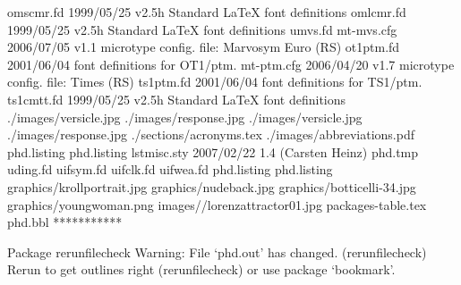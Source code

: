   omscmr.fd    1999/05/25 v2.5h Standard LaTeX font definitions
  omlcmr.fd    1999/05/25 v2.5h Standard LaTeX font definitions
    umvs.fd
  mt-mvs.cfg    2006/07/05 v1.1 microtype config. file: Marvosym Euro (RS)
  ot1ptm.fd    2001/06/04 font definitions for OT1/ptm.
  mt-ptm.cfg    2006/04/20 v1.7 microtype config. file: Times (RS)
  ts1ptm.fd    2001/06/04 font definitions for TS1/ptm.
 ts1cmtt.fd    1999/05/25 v2.5h Standard LaTeX font definitions
./images/versicle.jpg
./images/response.jpg
./images/versicle.jpg
./images/response.jpg
./sections/acronyms.tex
./images/abbreviations.pdf
     phd.listing
     phd.listing
 lstmisc.sty    2007/02/22 1.4 (Carsten Heinz)
     phd.tmp
   uding.fd
  uifsym.fd
  uifclk.fd
  uifwea.fd
     phd.listing
     phd.listing
graphics/krollportrait.jpg
graphics/nudeback.jpg
graphics/botticelli-34.jpg
graphics/youngwoman.png
images//lorenzattractor01.jpg
packages-table.tex
     phd.bbl
 ***********


Package rerunfilecheck Warning: File `phd.out' has changed.
(rerunfilecheck)                Rerun to get outlines right
(rerunfilecheck)                or use package `bookmark'.

